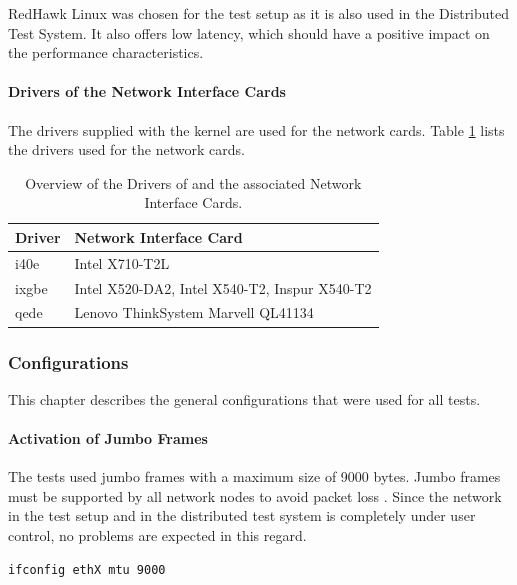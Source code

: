 RedHawk Linux was chosen for the test setup as it is also used in the Distributed Test System. It also offers low latency, which should have a positive impact on the performance characteristics.

\paragraph{Drivers of the Network Interface Cards}

The drivers supplied with the kernel are used for the network cards. Table \ref{tab:drivernic} lists the drivers used for the network cards.

\begin{table}[h]
\centering
\begin{tabular}{ll}
	\toprule
	Driver & Network Interface Card\\
	\midrule
	i40e & Intel X710-T2L\\
	ixgbe & Intel X520-DA2, Intel X540-T2, Inspur X540-T2 \\
	qede & Lenovo ThinkSystem Marvell QL41134\\
	\bottomrule
\end{tabular}
\caption{Overview of the Drivers of and the associated Network Interface Cards.}
\label{tab:drivernic}
\end{table}

\subsubsection{Configurations}
This chapter describes the general configurations that were used for all tests.

\paragraph{Activation of Jumbo Frames}

The tests used jumbo frames with a maximum size of 9000 bytes. Jumbo frames must be supported by all network nodes to avoid packet loss \cite{swsetup04}. Since the network in the test setup and in the distributed test system is completely under user control, no problems are expected in this regard. \\

\begin{lstlisting}[language=Bash, caption=Configuration of Jumbo Frames for the ethX Interface., label=lst:jumbocongif]
ifconfig ethX mtu 9000
\end{lstlisting}

